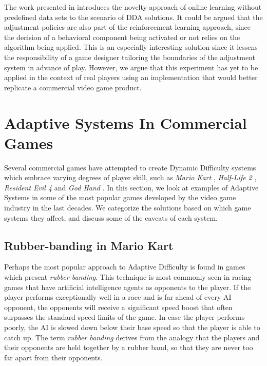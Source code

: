 The work presented in \cite{article_adaptivebehaviorai} introduces the novelty approach of online learning without predefined data sets to the scenario of DDA solutions. It could be argued that the adjustment policies are also part of the reinforcement learning approach, since the decision of a behavioral component being activated or not relies on the algorithm being applied. This is an especially interesting solution since it lessens the responsibility of a game designer tailoring the boundaries of the adjustment system in advance of play. However, we argue that this experiment has yet to be applied in the context of real players using an implementation that would better replicate a commercial video game product.


\section{Adaptive Systems In Commercial Games}

Several commercial games have attempted to create Dynamic Difficulty systems which embrace varying degrees of player skill, such as \emph{Mario Kart} , \emph{Half-Life 2} , \emph{Resident Evil 4}  and \emph{God Hand} . In this section, we look at examples of Adaptive Systems in some of the most popular games developed by the video game industry in the last decades. We categorize the solutions based on which game systems they affect, and discuss some of the caveats of each system.


\subsection{Rubber-banding in Mario Kart}

Perhaps the most popular approach to Adaptive Difficulty is found in games which present \emph{rubber banding}. This technique is most commonly seen in racing games that have artificial intelligence agents as opponents to the player. If the player performs exceptionally well in a race and is far ahead of every AI opponent, the opponents will receive a significant speed boost that often surpasses the standard speed limits of the game. In case the player performs poorly, the AI is slowed down below their base speed so that the player is able to catch up. The term \emph{rubber banding} derives from the analogy that the players and their opponents are held together by a rubber band, so that they are never too far apart from their opponents.

